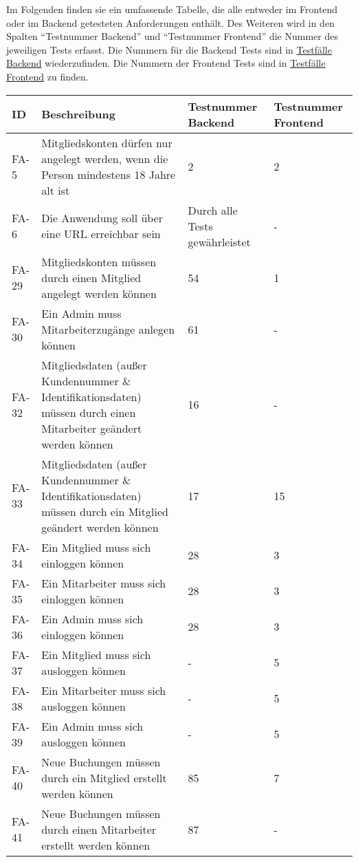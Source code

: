 Im Folgenden finden sie ein umfassende Tabelle, die alle entweder im Frontend oder im
Backend getesteten Anforderungen enthält.
Des Weiteren wird in den Spalten \enquote{Testnummer Backend} und \enquote{Testnummer Frontend} die Nummer
des jeweiligen Tests erfasst.
Die Nummern für die Backend Tests sind in \hyperref[subsec:testfaelle_backend]{Testfälle Backend} wiederzufinden.
Die Nummern der Frontend Tests sind in \hyperref[subsec:testfaelle_frontend]{Testfälle Frontend} zu finden.

\begin{longtable}{|m{2cm}|m{6.5cm}|m{2.5cm}|m{2.5cm}|}
    \hline
    \textbf{ID} & \textbf{Beschreibung} & \textbf{Testnummer Backend} & \textbf{Testnummer Frontend} \\
    \hline
    FA-5 & Mitgliedskonten dürfen nur angelegt werden, wenn die Person mindestens 18 Jahre alt ist & 2 & 2 \\
    \hline
    FA-6 & Die Anwendung soll über eine URL erreichbar sein & Durch alle Tests gewährleistet & - \\
    \hline
    FA-29 & Mitgliedskonten müssen durch einen Mitglied angelegt werden können & 54 & 1 \\
    \hline
    FA-30 & Ein Admin muss Mitarbeiterzugänge anlegen können & 61 & - \\
    \hline
    FA-32 & Mitgliedsdaten (außer Kundennummer \& Identifikationsdaten) müssen durch einen Mitarbeiter geändert werden können & 16 & - \\
    \hline
    FA-33 & Mitgliedsdaten (außer Kundennummer \& Identifikationsdaten) müssen durch ein Mitglied geändert werden können & 17 & 15 \\
    \hline
    FA-34 & Ein Mitglied muss sich einloggen können & 28 & 3 \\
    \hline
    FA-35 & Ein Mitarbeiter muss sich einloggen können & 28 & 3 \\
    \hline
    FA-36 & Ein Admin muss sich einloggen können & 28 & 3 \\
    \hline
    FA-37 & Ein Mitglied muss sich ausloggen können & - & 5 \\
    \hline
    FA-38 & Ein Mitarbeiter muss sich ausloggen können & - & 5 \\
    \hline
    FA-39 & Ein Admin muss sich ausloggen können & - & 5 \\
    \hline
    FA-40 & Neue Buchungen müssen durch ein Mitglied erstellt werden können & 85 & 7 \\
    \hline
    FA-41 & Neue Buchungen müssen durch einen Mitarbeiter erstellt werden können & 87 & - \\

\end{longtable}
